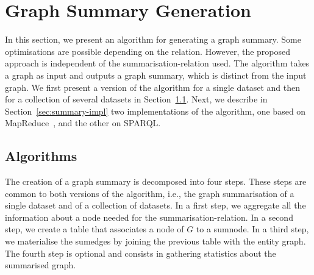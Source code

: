 \section{Graph Summary Generation}
\label{chap4:summary:algo}

In this section, we present an algorithm for generating a graph summary. Some optimisations are possible depending on the relation. However, the proposed approach is independent of the \gls{summarisation-relation} used. The algorithm takes a graph as input and outputs a graph summary, which is distinct from the input graph.
We first present a version of the algorithm for a single dataset and then for a collection of several datasets in Section~\ref{sec:summary-algos}.
Next, we describe in Section~\ref{sec:summary-impl} two implementations of the algorithm, one based on MapReduce~\cite{dean:2004:msd}, and the other on SPARQL.

\subsection{Algorithms}
\label{sec:summary-algos}

The creation of a graph summary is decomposed into four steps. These steps are common to both versions of the algorithm, i.e., the graph summarisation of a single dataset and of a collection of datasets. In a first step, we aggregate all the information about a node needed for the \gls{summarisation-relation}. In a second step, we create a table that associates a node of $G$ to a sumnode. In a third step, we materialise the sumedges by joining the previous table with the entity graph. The fourth step is optional and consists in gathering statistics about the summarised graph.


